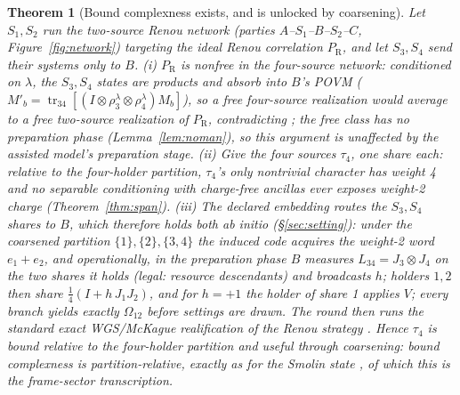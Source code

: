 \documentclass[11pt]{article}
\theoremstyle{plain}
\newtheorem{theorem}{Theorem}[section]
\theoremstyle{definition}
\theoremstyle{remark}
\theoremstyle{plain}
\newcommand{\tr}{\operatorname{tr}}
\newcommand{\Om}{\Omega}
\begin{document}
\begin{theorem}[Bound complexness exists, and is unlocked by
coarsening]\label{thm:abc}
Let $S_1,S_2$ run the two-source Renou network (parties
$A$--$S_1$--$B$--$S_2$--$C$, Figure~\ref{fig:network}) targeting
the ideal Renou correlation $P_{\mathrm R}$, and let $S_3,S_4$
send their systems only to $B$.
(i) $P_{\mathrm R}$ is nonfree in the four-source network:
conditioned on $\lambda$, the $S_3,S_4$ states are products and
absorb into $B$'s POVM
($M'_b = \tr_{34}[(I\otimes\rho_3^\lambda\otimes\rho_4^\lambda)
M_b]$), so a free four-source realization would average to a free
two-source realization of $P_{\mathrm R}$, contradicting
\cite{renou2021}; the free class has no preparation phase
(Lemma~\ref{lem:noman}), so this argument is unaffected by the
assisted model's preparation stage.
(ii) Give the four sources $\tau_4$, one share each: relative to
the four-holder partition, $\tau_4$'s only nontrivial character
has weight 4
and no separable conditioning with charge-free ancillas ever
exposes weight-2 charge (Theorem~\ref{thm:span}).
(iii) The declared embedding routes the $S_3,S_4$ shares to $B$,
which therefore holds both \emph{ab initio} (\S\ref{sec:setting}):
under the coarsened partition $\{1\},\{2\},\{3,4\}$ the induced
code acquires the weight-2 word $e_1+e_2$, and operationally, in
the preparation phase $B$ measures $L_{34} = J_3\otimes J_4$ on
the two shares it holds (legal: resource descendants) and
broadcasts $h$; holders $1,2$ then share
$\tfrac14(I + h\,J_1J_2)$, and for $h = +1$ the holder of share 1
applies $V$; every branch yields exactly $\Om_{12}$ before
settings are drawn. The round then runs the standard exact
WGS/McKague realification of the Renou strategy
\cite{wgs2025,mckague2009}. Hence $\tau_4$ is bound relative to
the four-holder partition and useful through coarsening: bound
complexness is partition-relative, exactly as for the Smolin
state \cite{smolin2001}, of which this is the frame-sector
transcription.
\end{theorem}
\end{document}
